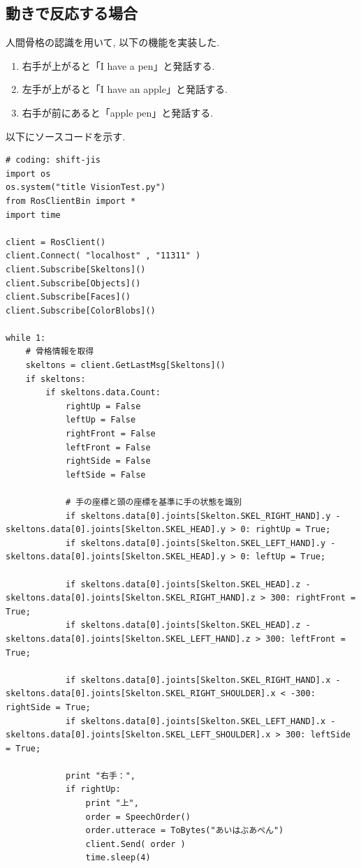 \documentclass[a4paper,11pt,titlepage]{jsarticle}
\begin{document}
\subsection{動きで反応する場合}
人間骨格の認識を用いて, 以下の機能を実装した.
\begin{enumerate}
  \item 右手が上がると「I have a pen」と発話する.
  \item 左手が上がると「I have an apple」と発話する.
  \item 右手が前にあると「apple pen」と発話する.
\end{enumerate}
以下にソースコードを示す.
\begin{lstlisting}[basicstyle=\ttfamily\footnotesize, caption = VisionTest.py, breaklines = true]
# coding: shift-jis
import os
os.system("title VisionTest.py")
from RosClientBin import *
import time

client = RosClient()
client.Connect( "localhost" , "11311" )
client.Subscribe[Skeltons]()
client.Subscribe[Objects]()
client.Subscribe[Faces]()
client.Subscribe[ColorBlobs]()

while 1:
    # 骨格情報を取得
    skeltons = client.GetLastMsg[Skeltons]()
    if skeltons:
        if skeltons.data.Count:
            rightUp = False
            leftUp = False
            rightFront = False
            leftFront = False
            rightSide = False
            leftSide = False

            # 手の座標と頭の座標を基準に手の状態を識別
            if skeltons.data[0].joints[Skelton.SKEL_RIGHT_HAND].y - skeltons.data[0].joints[Skelton.SKEL_HEAD].y > 0: rightUp = True;
            if skeltons.data[0].joints[Skelton.SKEL_LEFT_HAND].y - skeltons.data[0].joints[Skelton.SKEL_HEAD].y > 0: leftUp = True;

            if skeltons.data[0].joints[Skelton.SKEL_HEAD].z - skeltons.data[0].joints[Skelton.SKEL_RIGHT_HAND].z > 300: rightFront = True;
            if skeltons.data[0].joints[Skelton.SKEL_HEAD].z - skeltons.data[0].joints[Skelton.SKEL_LEFT_HAND].z > 300: leftFront = True;

            if skeltons.data[0].joints[Skelton.SKEL_RIGHT_HAND].x - skeltons.data[0].joints[Skelton.SKEL_RIGHT_SHOULDER].x < -300: rightSide = True;
            if skeltons.data[0].joints[Skelton.SKEL_LEFT_HAND].x - skeltons.data[0].joints[Skelton.SKEL_LEFT_SHOULDER].x > 300: leftSide = True;

            print "右手：",
            if rightUp:
                print "上",
                order = SpeechOrder()
                order.utterace = ToBytes("あいはぶあぺん")
                client.Send( order )
                time.sleep(4)


\end{lstlisting}
\end{document}
